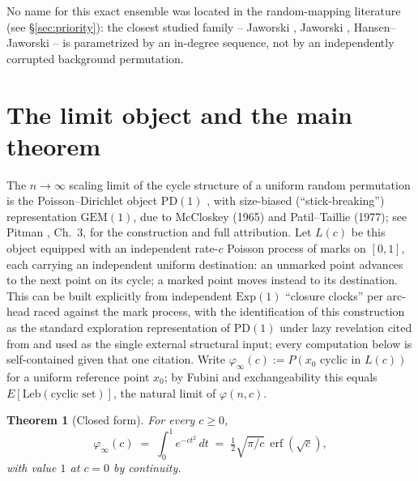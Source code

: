 \documentclass[11pt]{article}
\newtheorem{theorem}{Theorem}
\theoremstyle{remark}
\newcommand{\phiinf}{\varphi_\infty}
\newcommand{\Exp}{\mathrm{Exp}}
\newcommand{\PD}{\mathrm{PD}}
\begin{document}
No name for this exact ensemble was located in the random-mapping
literature (see \S\ref{sec:priority}): the closest studied family --
Jaworski \cite{jaworski1984}, Jaworski \cite{jaworski1998},
Hansen--Jaworski \cite{hansenjaworski2002,hansenjaworski2008,hansenjaworski2014}
-- is parametrized by an in-degree sequence, not by an independently
corrupted background permutation.

\section{The limit object and the main theorem}
\label{sec:theorem}

The $n\to\infty$ scaling limit of the cycle structure of a uniform
random permutation is the Poisson--Dirichlet object $\PD(1)$
\cite{kingman1975}, with size-biased (``stick-breaking'') representation
$\mathrm{GEM}(1)$, due to McCloskey (1965) and Patil--Taillie (1977);
see Pitman \cite{pitman2002}, Ch.~3, for the construction and full
attribution. Let $L(c)$ be
this object equipped with an independent rate-$c$ Poisson process of
marks on $[0,1]$, each carrying an independent uniform destination: an
unmarked point advances to the next point on its cycle; a marked point
moves instead to its destination. This can be built explicitly from
independent $\Exp(1)$ ``closure clocks'' per arc-head raced against the
mark process, with the identification of this construction as the
standard exploration representation of $\PD(1)$ under lazy revelation
cited from \cite{kingman1975,arratiabarbourtavare2003} and used as the
single external structural input; every computation below is
self-contained given that one citation. Write
$\phiinf(c):=P(x_0 \text{ cyclic in } L(c))$ for a uniform reference
point $x_0$; by Fubini and exchangeability this equals
$E[\mathrm{Leb}(\text{cyclic set})]$, the natural limit of $\varphi(n,c)$.

\begin{theorem}[Closed form]
\label{thm:main}
For every $c\ge0$,
\[
  \phiinf(c) \;=\; \int_0^1 e^{-c t^2}\,dt \;=\; \tfrac12\sqrt{\pi/c}\,\operatorname{erf}(\sqrt c),
\]
with value $1$ at $c=0$ by continuity.
\end{theorem}
\end{document}
